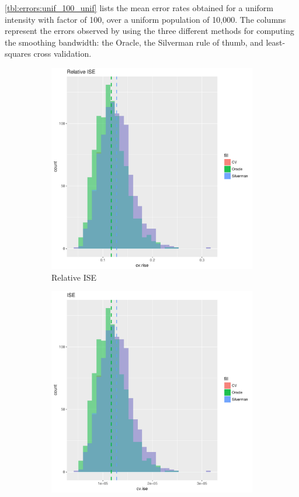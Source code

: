 \autoref{tbl:errors:unif_100_unif} lists the mean error rates obtained for a uniform intensity with factor of 100, over a uniform population of 10,000.
The columns represent the errors observed by using the three different methods for computing the smoothing bandwidth:
the Oracle, the Silverman rule of thumb, and least-squares cross validation.

\begin{figure}[htbp]
    \centering
    \begin{subfigure}[b]{0.45\textwidth}
    \includegraphics[width=\textwidth]{results/unif_100_unif/output/ise-relative-histogram}
    \caption{Relative ISE}
    \end{subfigure}
    \begin{subfigure}[b]{0.45\textwidth}
    \includegraphics[width=\textwidth]{results/unif_100_unif/output/ise-histogram}

\end{subfigure}
\end{figure}
